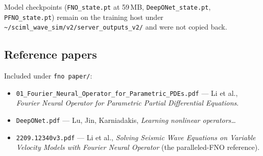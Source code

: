 \documentclass[11pt,a4paper]{article}
\begin{document}
\noindent Model checkpoints (\texttt{FNO\_state.pt} at 59\,MB,
\texttt{DeepONet\_state.pt}, \texttt{PFNO\_state.pt}) remain on the training host
under \texttt{\textasciitilde/sciml\_wave\_sim/v2/server\_outputs\_v2/} and were
not copied back.

\subsection*{Reference papers}

Included under \texttt{fno paper/}:

\begin{itemize}[leftmargin=*,itemsep=2pt]
\item \texttt{01\_Fourier\_Neural\_Operator\_for\_Parametric\_PDEs.pdf} --- Li
et al., \emph{Fourier Neural Operator for Parametric Partial Differential
Equations}.
\item \texttt{DeepONet.pdf} --- Lu, Jin, Karniadakis, \emph{Learning nonlinear
operators\ldots}
\item \texttt{2209.12340v3.pdf} --- Li et al., \emph{Solving Seismic Wave
Equations on Variable Velocity Models with Fourier Neural Operator} (the
paralleled-FNO reference).
\end{itemize}
\end{document}
